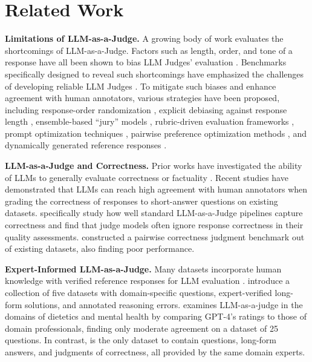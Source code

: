 \section{Related Work}

\textbf{Limitations of LLM-as-a-Judge.}
A growing body of work evaluates the shortcomings of LLM-as-a-Judge. Factors such as length, order, and tone of a response have all been shown to bias LLM Judges' evaluation \citep{mtbench,CognitiveBiases,SystematicEvaluationofLLMAsAJudge}. Benchmarks specifically designed to reveal such shortcomings have emphasized the challenges of developing reliable LLM Judges \citep{CognitiveBiases,JusticeOrPrejudice}. To mitigate such biases and enhance agreement with human annotators, various strategies have been proposed, including response-order randomization \citep{mtbench}, explicit debiasing against response length \citep{alpacaeval2}, ensemble-based “jury” models \citep{llmjuris}, rubric-driven evaluation frameworks \citep{hashemi-etal-2024-llm,rubrics}, prompt optimization techniques \citep{ZEPO}, pairwise preference optimization methods \citep{PAIRS}, and dynamically generated reference responses \citep{RevisEval}.

\textbf{LLM-as-a-Judge and Correctness.} Prior works have investigated the ability of LLMs to generally evaluate correctness or factuality \citep{min-etal-2023-factscore,song-etal-2024-veriscore,chen2023felmbenchmarkingfactualityevaluation}. Recent studies \citep{JudgingTheJudges,ReferenceGuidedVerdict,henkel2024largelanguagemodelsmake} have demonstrated that LLMs can reach high agreement with human annotators when grading the correctness of responses to short-answer questions on existing datasets. \citet{SOSBench} specifically study how well standard LLM-as-a-Judge pipelines capture correctness and find that judge models often ignore response correctness in their quality assessments. \citet{JudgeBench} constructed a pairwise correctness judgment benchmark out of existing datasets, also finding poor performance.

\textbf{Expert-Informed LLM-as-a-Judge.} Many datasets incorporate human knowledge with verified reference responses for LLM evaluation \citep{bai-etal-2024-mt,malaviya-etal-2024-expertqa,chen-etal-2024-fintextqa,10.1609/aaai.v38i21.30362}.  \cite{recchia2025findtheflawsannotatederrorsdetecting} introduce a collection of five datasets with domain-specific questions, expert-verified long-form solutions, and annotated reasoning errors.  \citet{10.1145/3708359.3712091}  examines LLM-as-a-judge in the domains of dietetics and mental health by comparing GPT-4’s ratings to those of domain professionals, finding only moderate agreement on a dataset of 25 questions. In contrast, \judgebenchmark{} is the only dataset to contain questions, long-form answers, and judgments of correctness, all provided by the same domain experts.






